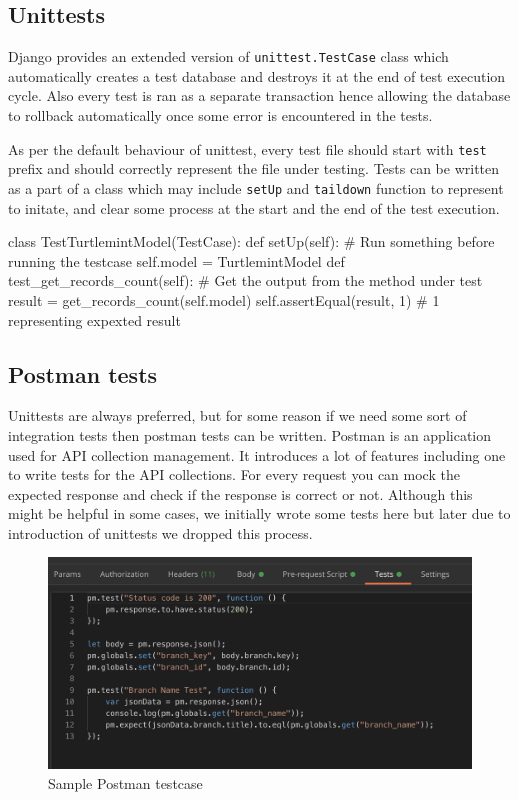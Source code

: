 \subsection{Unittests}
Django provides an extended version of \texttt{unittest.TestCase} class which
automatically creates a test database and destroys it at the end of test
execution cycle. Also every test is ran as a separate transaction hence
allowing the database to rollback automatically once some error is encountered
in the tests.

As per the default behaviour of unittest, every test file should start with
\texttt{test} prefix and should correctly represent the file under testing.
Tests can be written as a part of a class which may include \texttt{setUp}
and \texttt{taildown} function to represent to initate, and clear some process
at the start and the end of the test execution.

\begin{pythoncode}
class TestTurtlemintModel(TestCase):
    def setUp(self):
        # Run something before running the testcase
        self.model = TurtlemintModel
    def test_get_records_count(self):
        # Get the output from the method under test
        result = get_records_count(self.model)
        self.assertEqual(result, 1) # 1 representing expexted result
\end{pythoncode}

\subsection{Postman tests}
Unittests are always preferred, but for some reason if we need some sort of
integration tests then postman tests can be written. Postman is an application
used for API collection management. It introduces a lot of features including
one to write tests for the API collections. For every request you can mock
the expected response and check if the response is correct or not. Although
this might be helpful in some cases, we initially wrote some tests here but
later due to introduction of unittests we dropped this process.

\begin{figure}
\includegraphics[width=\textwidth]{ch4/postman_test.png}
\caption{Sample Postman testcase}
\end{figure}
